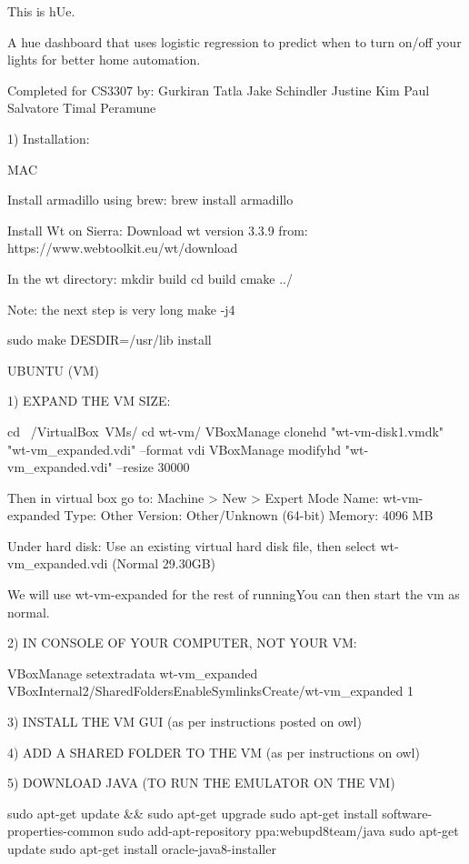 This is h\+Ue.

A hue dashboard that uses logistic regression to predict when to turn on/off your lights for better home automation.

Completed for C\+S3307 by\+: Gurkiran Tatla Jake Schindler Justine Kim Paul Salvatore Timal Peramune

1) Installation\+: \begin{DoxyVerb}MAC

    Install armadillo using brew:
        brew install armadillo


    Install Wt on Sierra:
        Download wt version 3.3.9 from:
            https://www.webtoolkit.eu/wt/download

        In the wt directory:
            mkdir build
            cd build
            cmake ../

            Note: the next step is very long
            make -j4        

            sudo make DESDIR=/usr/lib install


UBUNTU (VM)

    1) EXPAND THE VM SIZE:

        cd ~/VirtualBox\ VMs/
        cd wt-vm/
        VBoxManage clonehd "wt-vm-disk1.vmdk" "wt-vm_expanded.vdi" --format vdi
        VBoxManage modifyhd "wt-vm_expanded.vdi" --resize 30000

        Then in virtual box go to: Machine > New > Expert Mode
            Name: wt-vm-expanded
            Type: Other
            Version: Other/Unknown (64-bit)
            Memory: 4096 MB

            Under hard disk:
            Use an existing virtual hard disk file, then select wt-vm_expanded.vdi (Normal 29.30GB)

        We will use wt-vm-expanded for the rest of runningYou can then start the vm as normal.

    2) IN CONSOLE OF YOUR COMPUTER, NOT YOUR VM:

        VBoxManage setextradata wt-vm_expanded VBoxInternal2/SharedFoldersEnableSymlinksCreate/wt-vm_expanded 1

    3) INSTALL THE VM GUI (as per instructions posted on owl)

    4) ADD A SHARED FOLDER TO THE VM (as per instructions on owl)

    5) DOWNLOAD JAVA (TO RUN THE EMULATOR ON THE VM)

        sudo apt-get update && sudo apt-get upgrade
        sudo apt-get install software-properties-common
        sudo add-apt-repository ppa:webupd8team/java
        sudo apt-get update
        sudo apt-get install oracle-java8-installer


\end{DoxyVerb}
